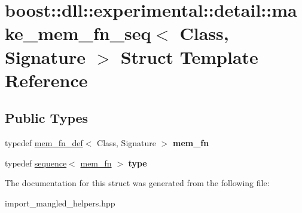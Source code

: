 \hypertarget{a00201}{}\section{boost\+:\+:dll\+:\+:experimental\+:\+:detail\+:\+:make\+\_\+mem\+\_\+fn\+\_\+seq$<$ Class, Signature $>$ Struct Template Reference}
\label{a00201}
\subsection*{Public Types}
\begin{DoxyCompactItemize}
\item 
typedef \hyperlink{a00219}{mem\+\_\+fn\+\_\+def}$<$ Class, Signature $>$ {\bfseries mem\+\_\+fn}\hypertarget{a00201_add99b094e64960490544e8bef5cd6a24}{}\label{a00201_add99b094e64960490544e8bef5cd6a24}

\item 
typedef \hyperlink{a00266}{sequence}$<$ \hyperlink{a00219}{mem\+\_\+fn} $>$ {\bfseries type}\hypertarget{a00201_ace226b4607233d6e491df32c3393ab23}{}\label{a00201_ace226b4607233d6e491df32c3393ab23}

\end{DoxyCompactItemize}


The documentation for this struct was generated from the following file\+:\begin{DoxyCompactItemize}
\item 
import\+\_\+mangled\+\_\+helpers.\+hpp\end{DoxyCompactItemize}
